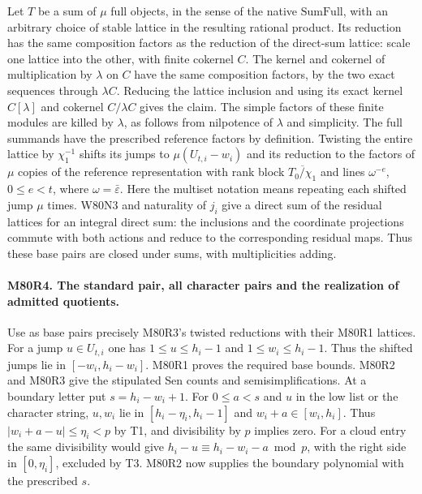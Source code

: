 Let $T$ be a sum of $\mu$ full objects, in the sense of the native
$\mathrm{SumFull}$, with an arbitrary choice of stable lattice in
the resulting rational product. Its reduction has the same
composition factors as the reduction of the direct-sum lattice:
scale one lattice into the other, with finite cokernel $C$. The
kernel and cokernel of multiplication by $\lambda$ on $C$ have
the same composition factors, by the two exact sequences through
$\lambda C$. Reducing the lattice inclusion and using its exact
kernel $C[\lambda]$ and cokernel $C/\lambda C$ gives the claim.
The simple factors of these finite modules are killed by $\lambda$,
as follows from nilpotence of $\lambda$ and simplicity. The full
summands have the prescribed reference factors by definition.
Twisting the entire lattice by $\chi_1^{-1}$ shifts its jumps to
$\mu(U_{t,i}-w_i)$ and its reduction to the factors of $\mu$ copies
of the reference representation with rank block $\overline{T_0/\chi_1}$
and lines $\omega^{-e}$, $0\le e<t$, where $\omega=\bar\varepsilon$.
Here the multiset notation means repeating each shifted jump $\mu$
times. W80N3 and naturality of $j_i$ give a direct sum of the
residual lattices for an integral direct sum: the inclusions and
the coordinate projections commute with both actions and reduce
to the corresponding residual maps. Thus these base pairs are
closed under sums, with multiplicities adding.

\paragraph{M80R4. The standard pair, all character pairs and the realization of admitted quotients.}
Use as base pairs precisely M80R3's twisted reductions with their
M80R1 lattices. For a jump $u\in U_{t,i}$ one has
$1\le u\le h_i-1$ and $1\le w_i\le h_i-1$. Thus the shifted
jumps lie in $[-w_i,h_i-w_i]$. M80R1 proves the required base
bounds. M80R2 and M80R3 give the stipulated Sen counts and
semisimplifications. At a boundary letter put $s=h_i-w_i+1$.
For $0\le a<s$ and $u$ in the low list or the character string,
$u,w_i$ lie in $[h_i-\eta_i,h_i-1]$ and $w_i+a\in[w_i,h_i]$.
Thus $|w_i+a-u|\le\eta_i<p$ by T1, and divisibility by $p$ implies
zero. For a cloud entry the same divisibility would give
$h_i-u\equiv h_i-w_i-a\bmod p$, with the right side in
$[0,\eta_i]$, excluded by T3. M80R2 now supplies the boundary
polynomial with the prescribed $s$.

